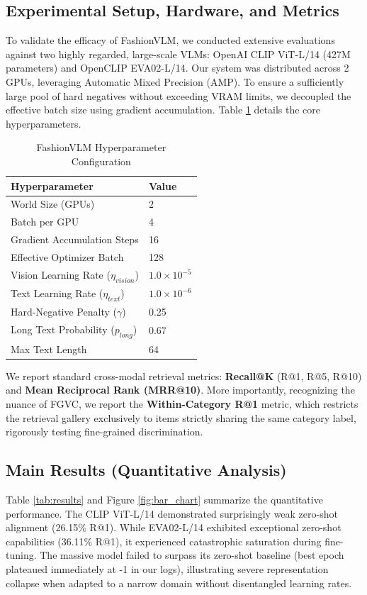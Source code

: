 \documentclass[conference]{IEEEtran}
\begin{document}
\subsection{Experimental Setup, Hardware, and Metrics}
To validate the efficacy of FashionVLM, we conducted extensive evaluations against two highly regarded, large-scale VLMs: OpenAI CLIP ViT-L/14 (427M parameters) and OpenCLIP EVA02-L/14. Our system was distributed across 2 GPUs, leveraging Automatic Mixed Precision (AMP). To ensure a sufficiently large pool of hard negatives without exceeding VRAM limits, we decoupled the effective batch size using gradient accumulation. Table \ref{tab:hyperparams} details the core hyperparameters.

\begin{table}[htbp]
\caption{FashionVLM Hyperparameter Configuration}
\label{tab:hyperparams}
\centering
\begin{tabular}{@{}ll@{}}
\toprule
\textbf{Hyperparameter} & \textbf{Value} \\ \midrule
World Size (GPUs) & 2 \\
Batch per GPU & 4 \\
Gradient Accumulation Steps & 16 \\
Effective Optimizer Batch & 128 \\
Vision Learning Rate ($\eta_{vision}$) & $1.0 \times 10^{-5}$ \\
Text Learning Rate ($\eta_{text}$) & $1.0 \times 10^{-6}$ \\
Hard-Negative Penalty ($\gamma$) & 0.25 \\
Long Text Probability ($p_{long}$) & 0.67 \\
Max Text Length & 64 \\ \bottomrule
\end{tabular}
\end{table}

We report standard cross-modal retrieval metrics: \textbf{Recall@K} (R@1, R@5, R@10) and \textbf{Mean Reciprocal Rank (MRR@10)}. More importantly, recognizing the nuance of FGVC, we report the \textbf{Within-Category R@1} metric, which restricts the retrieval gallery exclusively to items strictly sharing the same category label, rigorously testing fine-grained discrimination.

\subsection{Main Results (Quantitative Analysis)}
Table \ref{tab:results} and Figure \ref{fig:bar_chart} summarize the quantitative performance. The CLIP ViT-L/14 demonstrated surprisingly weak zero-shot alignment (26.15\% R@1). While EVA02-L/14 exhibited exceptional zero-shot capabilities (36.11\% R@1), it experienced catastrophic saturation during fine-tuning. The massive model failed to surpass its zero-shot baseline (best epoch plateaued immediately at -1 in our logs), illustrating severe representation collapse when adapted to a narrow domain without disentangled learning rates.
\end{document}
